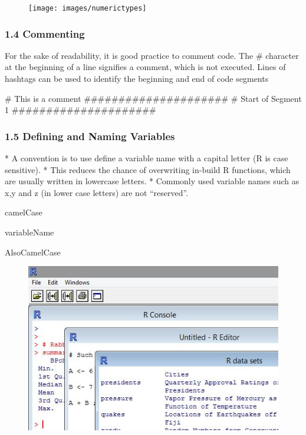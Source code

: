  
 
 
 
 \begin{figure}
 \centering
 \texttt{[image: images/numerictypes]}    
 \end{figure}
    
 
 \frametitle{1.4 Commenting}
 For the sake of readability, it is good practice to comment code. The \# character at the
 beginning of a line signifies a comment, which is not executed. Lines of hashtags can be used
 to identify the beginning and end of code segments
 \begin{framed}
 \begin{semiverbatim}
 # This is a comment
 #####################
 # Start of Segment 1
 #####################
 \end{semiverbatim}
 \end{framed}
 
 
 \frametitle{1.5 Defining and Naming Variables}
 
*  A convention is to use define a variable name with a capital letter (R is case sensitive). 
*  This
 reduces the chance of overwriting in-build R functions, which are usually written in lowercase
 letters. 
*  Commonly used variable names such as x,y and z (in lower case letters) are not “reserved”.

 
 \begin{semiverbatim}
 camelCase
 
 variableName
 
 AlsoCamelCase
 \end{semiverbatim}
 
 
 \begin{figure}
 \centering
 \includegraphics[width=0.7\linewidth]{images/Rmultiplewindows}
 \end{figure}
 
